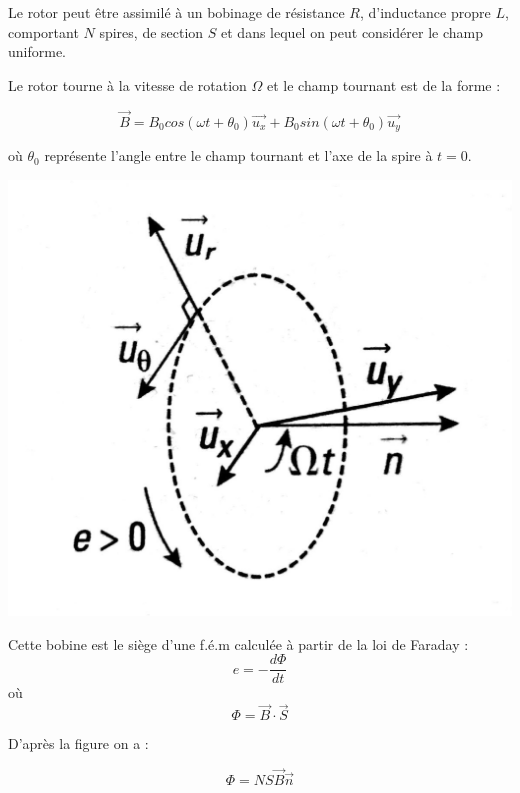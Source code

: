 \documentclass{article}
\begin{document}
Le rotor peut être assimilé à un bobinage de résistance $R$, d'inductance propre $L$, comportant $N$ spires, de section $S$ et dans lequel on peut considérer le champ uniforme.\medskip

Le rotor tourne à la vitesse de rotation $\Omega$ et le champ tournant est de la forme :

\begin{equation}
    \vec{B} = B_0 cos(\omega t + \theta_0) \vec{u_x} + B_0 sin(\omega t + \theta_0 ) \vec{u_y}
\end{equation}

où $\theta_0$ représente l'angle entre le champ tournant et l'axe de la spire à $t=0$.

\begin{center}
    \includegraphics[scale=0.14]{spireasync.jpg}
\end{center}

Cette bobine est le siège d'une f.é.m calculée à partir de la loi de Faraday :
\begin{equation}
    e =- \frac{d\Phi}{dt} 
\end{equation}
où 
\begin{equation}
    \Phi = \vec{B} \cdot \vec{S}
\end{equation}

D'après la figure on a :

\begin{equation}
    \Phi = NS\vec{B} \vec{n}
\end{equation}
\end{document}

